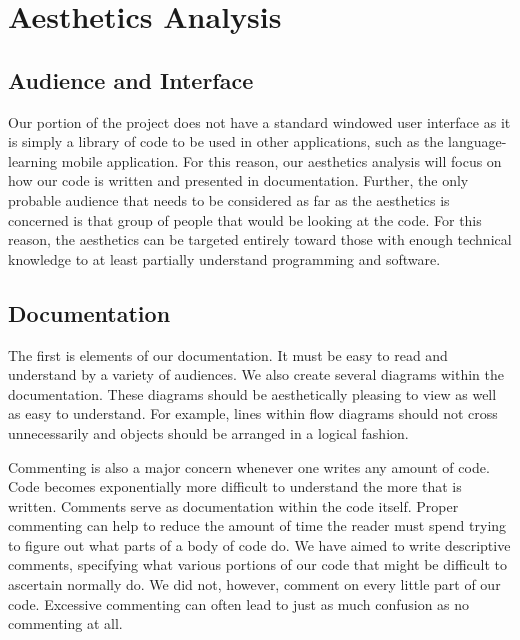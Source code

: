 \chapter{Aesthetics Analysis}

\section{Audience and Interface}
Our portion of the project does not have a standard windowed user interface as it is simply a library of code to be used in other applications, such as the language-learning mobile application. For this reason, our aesthetics analysis will focus on how our code is written and presented in documentation. Further, the only probable audience that needs to be considered as far as the aesthetics is concerned is that group of people that would be looking at the code. For this reason, the aesthetics can be targeted entirely toward those with enough technical knowledge to at least partially understand programming and software.


\section{Documentation}
The first is elements of our documentation. It must be easy to read and understand by a variety of audiences. We also create several diagrams within the documentation. These diagrams should be aesthetically pleasing to view as well as easy to understand. For example, lines within flow diagrams should not cross unnecessarily and objects should be arranged in a logical fashion.

Commenting is also a major concern whenever one writes any amount of code. Code becomes exponentially more difficult to understand the more that is written. Comments serve as documentation within the code itself. Proper commenting can help to reduce the amount of time the reader must spend trying to figure out what parts of a body of code do. We have aimed to write descriptive comments, specifying what various portions of our code that might be difficult to ascertain normally do. We did not, however, comment on every little part of our code. Excessive commenting can often lead to just as much confusion as no commenting at all.


